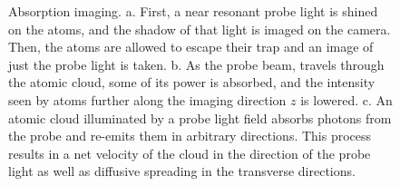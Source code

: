 \documentclass[12pt]{iopart}
\begin{document}
\begin{figure}
\caption{Absorption imaging. a. First, a near resonant probe light is shined on the atoms, and the shadow of that light is imaged on the camera. Then, the atoms are allowed to escape their trap and an image of just the probe light is taken. b.  As the probe beam, travels through the atomic cloud, some of its power is absorbed, and the intensity seen by atoms further along the imaging direction $z$ is lowered.  c. An atomic cloud illuminated by a probe light field absorbs photons from the probe and re-emits them in arbitrary directions. This process results in a net velocity of the cloud in the direction of the probe light as well as diffusive spreading in the transverse directions.  }  
\label{fig:absorptionIntor}
\end{figure}
\end{document}
